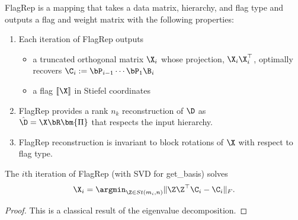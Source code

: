FlagRep is a mapping that takes a data matrix, hierarchy, and flag type and outputs a flag and weight matrix with the following properties:
\begin{enumerate}
\item Each iteration of FlagRep outputs 
\begin{itemize}
    \item a truncated orthogonal matrix $\X_i$ whose projection, $\X_i\X_i^\top$, optimally recovers $\C_i := \bP_{i-1} \cdots \bP_1 \B_i$
    \item a flag $[\![\X ]\!]$ in Stiefel coordinates
\end{itemize}
\item FlagRep provides a rank $n_k$ reconstruction of $\D$ as \\ $\hat{\D} = \X \bR \bm{\Pi}$ that respects the input hierarchy.
\item FlagRep reconstruction is invariant to block rotations of $\X$ with respect to flag type.
\end{enumerate}
\begin{prop}\label{prop:leftsvs}
    The $i$th iteration of FlagRep (with SVD for get\_basis) solves 
    \begin{equation}
        \X_{i} = \argmin_{\Z \in St(m_i,n)} \| \Z \Z^\top \C_i - \C_i \|_F.
    \end{equation}
\end{prop}
\begin{proof}
    This is a classical result of the eigenvalue decomposition.
\end{proof}



